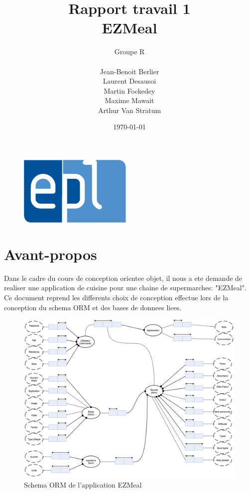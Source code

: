 \documentclass[a4paper,10pt]{report}
\title{Rapport travail 1 \\EZMeal}
\author{Groupe R\\ \\Jean-Benoit Berlier\\Laurent Desausoi \\ Martin Fockedey \\Maxime Mawait \\Arthur Van Stratum 
}
\date{\today}
\begin{document}
\begin{titlepage}
\begin{figure}[t]
\includegraphics[scale=0.3]{epl-logo.jpg}
\end{figure}

\maketitle 

\end{titlepage}

\tableofcontents

\pagebreak

\chapter{Avant-propos}

Dans le cadre du cours de conception orientee objet, il nous a ete demande de realiser une application de cuisine pour une chaine de supermarches: "EZMeal".
Ce document reprend les differents choix de conception effectue lors de la conception du schema ORM et des bases de donnees liees.

\begin{figure}[!h]
	\center
	\includegraphics[scale = 0.2]{SchemaORM.jpg}
	\caption{Schema ORM de l'application EZMeal}
	\label{ORM}
\end{figure}
\end{document}
